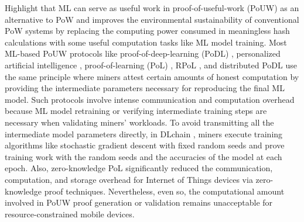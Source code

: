 Highlight that ML can serve as useful work in proof-of-useful-work
(PoUW) as an alternative to PoW and improves the environmental sustainability
of conventional PoW systems by replacing the computing power consumed
in meaningless hash calculations with some useful computation tasks
like ML model training. Most ML-based PoUW protocols like proof-of-deep-learning
(PoDL) \cite{Chenli2019}, personalized artificial intelligence \cite{Zhang2023jul},
proof-of-learning (PoL) \cite{Jia2021}, RPoL \cite{Zhang2023jul},
and distributed PoDL \cite{Su2023} use the same principle where miners
attest certain amounts of honest computation by providing the intermediate
parameters necessary for reproducing the final ML model. Such protocols
involve intense communication and computation overhead because  ML
model retraining or verifying intermediate training steps are necessary
when validating miners' workloads. To avoid transmitting all the intermediate
model parameters directly, in DLchain \cite{Chenli2020}, miners execute
training algorithms like stochastic gradient descent with fixed random
seeds and prove training work with the random seeds and the accuracies
of the model at each epoch.  Also, zero-knowledge PoL \cite{Zhang2024a}
significantly reduced the communication, computation, and storage
overhead for Internet of Things devices via zero-knowledge proof techniques.
Nevertheless, even  so, the computational amount involved in PoUW
proof generation or validation remains unacceptable  for resource-constrained
mobile devices.\vspace{-0.1cm}